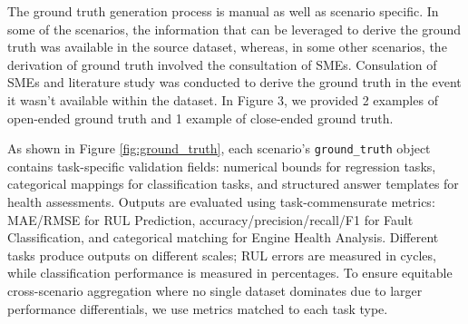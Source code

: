 \documentclass[sigconf, screen, nonacm]{acmart}
\begin{document}
The ground truth generation process is manual as well as scenario specific. In some of the scenarios, the information that can be leveraged to derive the ground truth was available in the source dataset, whereas, in some other scenarios, the derivation of ground truth involved the consultation of SMEs. Consulation of SMEs and literature study was conducted to derive the ground truth in the event it wasn't available within the dataset. In Figure 3, we provided 2 examples of open-ended ground truth and 1 example of close-ended ground truth.


As shown in Figure \ref{fig:ground_truth}, each scenario's \texttt{ground\_truth} object contains task-specific validation fields: numerical bounds for regression tasks, categorical mappings for classification tasks, and structured answer templates for health assessments. Outputs are evaluated using task-commensurate metrics: MAE/RMSE for RUL Prediction, accuracy/precision/recall/F1 for Fault Classification, and categorical matching for Engine Health Analysis. Different tasks produce outputs on different scales; RUL errors are measured in cycles, while classification performance is measured in percentages. To ensure equitable cross-scenario aggregation where no single dataset dominates due to larger performance differentials, we use metrics matched to each task type.                               
                                                             
\end{document}
